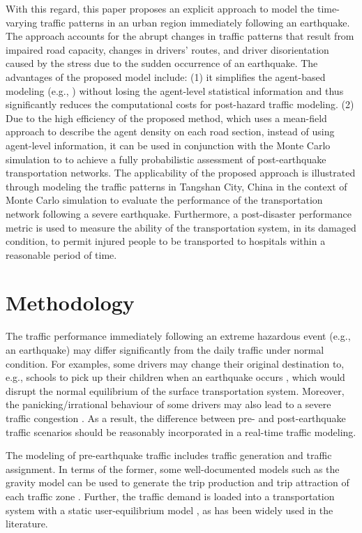 \documentclass[review,11pt,nonatbib]{elsarticle}
\begin{document}
With this regard, this paper proposes an explicit approach to model the time-varying traffic patterns in an urban region immediately following an earthquake. The approach accounts for the abrupt changes in traffic patterns that result from impaired road capacity, changes in drivers' routes, and driver disorientation caused by the stress due to the sudden occurrence of an earthquake. The advantages of the proposed model include: (1) it simplifies the agent-based modeling (e.g., \citealt{feng2017post}) without losing the agent-level statistical information and thus significantly reduces the computational costs for post-hazard traffic modeling. (2) Due to the high efficiency of the proposed method, which uses a mean-field approach to describe the agent density on each road section, instead of using agent-level information, it can be used in conjunction with  the Monte Carlo simulation to to achieve a fully probabilistic assessment of post-earthquake transportation networks. The applicability of the proposed approach is illustrated through modeling the traffic patterns in Tangshan City, China in the context of Monte Carlo simulation to evaluate the performance of the transportation network following a severe earthquake. Furthermore, a post-disaster performance metric is used to measure the ability of the transportation system, in its damaged condition, to permit injured people to be transported to hospitals within a reasonable period of time.
\section{Methodology}
The traffic performance immediately following an extreme hazardous event (e.g., an earthquake) may differ significantly from the daily traffic under normal condition. For examples, some drivers may change their original destination to, e.g., schools to pick up their children when an earthquake occurs \citep{liu2008analysis,ahn2014study}, which would disrupt the normal equilibrium of the surface transportation system. Moreover, the panicking/irrational behaviour of some drivers may also lead to a severe traffic congestion \citep{nigg1984earthquakes,Helbing2000Simulating}. As a result, the difference between pre- and post-earthquake traffic scenarios should be reasonably incorporated in a real-time traffic modeling.
\par The modeling of pre-earthquake traffic includes traffic generation and traffic assignment. In terms of the former, some well-documented models such as the gravity model can be used to generate the trip production and trip attraction of each traffic zone \citep{moriarty2007modeling,chang2012post}. Further, the traffic demand is loaded into a transportation system with a static user-equilibrium model \citep{beckmann1956studies}, as has been widely used in the literature. 
\end{document}
